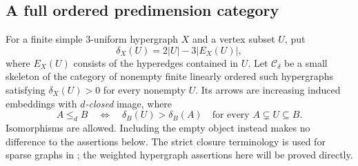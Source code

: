 \subsection{A full ordered predimension category}

For a finite simple $3$-uniform hypergraph $X$ and a vertex subset $U$,
put
\[
 \delta_X(U)=2|U|-3|E_X(U)|,
\]
where $E_X(U)$ consists of the hyperedges contained in $U$.
Let $\mathcal C_\delta$ be a small skeleton of the category of nonempty
finite linearly ordered such hypergraphs satisfying
$\delta_X(U)>0$ for every nonempty $U$. Its arrows are increasing
induced embeddings with \emph{$d$-closed} image, where
\[
 A\leq_d B
 \quad\Longleftrightarrow\quad
 \delta_B(U)>\delta_B(A)
 \quad\text{for every }A\subsetneq U\subseteq B.
 \tag{DC}\label{eq:predimension-dclosed}
\]
Isomorphisms are allowed. Including the empty object instead makes
no difference to the assertions below. The strict closure terminology
is used for sparse graphs in
\citet[Definition~4.4]{EvansHubickaNesetril2019}; the weighted
hypergraph assertions here will be proved directly.

